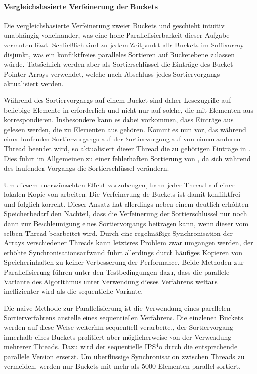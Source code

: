 \paragraph{Vergleichsbasierte Verfeinerung der Buckets}
Die vergleichsbasierte Verfeinerung zweier Buckets  und  geschieht intuitiv unabhängig voneinander, was eine hohe Parallelisierbarkeit dieser Aufgabe vermuten lässt.
Schließlich sind zu jedem Zeitpunkt alle Buckets im Suffixarray disjunkt, was ein konfliktfreies paralleles Sortieren auf Bucketebene zulassen würde.
Tatsächlich werden aber als Sortierschlüssel die Einträge des Bucket-Pointer Arrays \bptr verwendet, welche nach Abschluss jedes Sortiervorgangs aktualisiert werden.\par
Während des Sortiervorgangs auf einem Bucket  sind daher Lesezugriffe auf beliebige Elemente in \bptr erforderlich und nicht nur auf solche, die mit Elementen aus  korrespondieren.
Insbesondere kann es dabei vorkommen, dass Einträge aus \bptr gelesen werden, die zu Elementen aus  gehören.
Kommt es nun vor, das während eines laufenden Sortiervorgangs auf  der Sortiervorgang auf  von einem anderen Thread beendet wird, so aktualisiert dieser Thread die zu  gehörigen Einträge in \bptr.
Dies führt im Allgemeinen zu einer fehlerhaften Sortierung von , da sich während des laufenden Vorgangs die Sortierschlüssel verändern.\par\smallskip
Um diesem unerwünschten Effekt vorzubeugen, kann jeder Thread auf einer lokalen Kopie von \bptr arbeiten.
Die Verfeinerung de Buckets ist damit konfliktfrei und folglich korrekt.
Dieser Ansatz hat allerdings neben einem deutlich erhóhten Speicherbedarf den Nachteil, dass die Verfeinerung der Sortierschlüssel nur noch dann zur Beschleunigung eines Sortiervorgangs beitragen kann, wenn dieser vom selben Thread bearbeitet wird.
Durch eine regelmäßige Synchronisation der \bptr Arrays verschiedener Threads kann letzteres Problem zwar umgangen werden, der erhöhte Synchronisationsaufwand führt allerdings durch häufiges Kopieren von Speicherinhalten zu keiner Verbesserung der Performance.
Beide Methoden zur Parallelisierung führen unter den Testbedingungen dazu, dass die parallele Variante des Algorithmus unter Verwendung dieses Verfahrens weitaus ineffizienter wird als die sequentielle Variante.\par\smallskip
Die naive Methode zur Parallelisierung ist die Verwendung eines parallelen Sortierverfahrens anstelle eines sequentiellen Verfahrens.
Die einzlenen Buckets werden auf diese Weise weiterhin sequentiell verarbeitet, der Sortiervorgang innerhalb eines Buckets profitiert aber möglicherweise von der Verwendung mehrerer Threads. Dazu wird der sequentielle IPS\(^4\)o \cite{axtmann2017} durch die entsprechende parallele Version ersetzt.
Um überflüssige Synchronisation zwischen Threads zu vermeiden, werden nur Buckets mit mehr als 5000 Elementen parallel sortiert.

